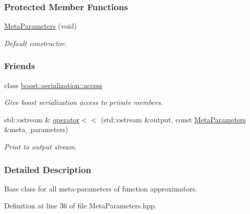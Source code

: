 \subsubsection*{Protected Member Functions}
\begin{DoxyCompactItemize}
\item 
\hyperlink{classDmpBbo_1_1MetaParameters_ae73979b117d45e439547c42eb1b4fc7b}{Meta\+Parameters} (void)
\begin{DoxyCompactList}\small\item\em Default constructor. \end{DoxyCompactList}\end{DoxyCompactItemize}
\subsubsection*{Friends}
\begin{DoxyCompactItemize}
\item 
class \hyperlink{classDmpBbo_1_1MetaParameters_ac98d07dd8f7b70e16ccb9a01abf56b9c}{boost\+::serialization\+::access}
\begin{DoxyCompactList}\small\item\em Give boost serialization access to private members. \end{DoxyCompactList}\item 
std\+::ostream \& \hyperlink{classDmpBbo_1_1MetaParameters_ac803ef1abac20fbd3a74231bcd290d22}{operator$<$$<$} (std\+::ostream \&output, const \hyperlink{classDmpBbo_1_1MetaParameters}{Meta\+Parameters} \&meta\+\_\+parameters)
\begin{DoxyCompactList}\small\item\em Print to output stream. \end{DoxyCompactList}\end{DoxyCompactItemize}


\subsubsection{Detailed Description}
Base class for all meta-\/parameters of function approximators. 

Definition at line 36 of file Meta\+Parameters.\+hpp.



